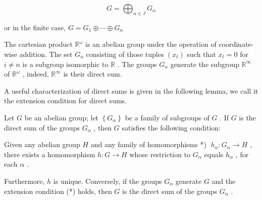 \[
G = {\bigoplus }_{\alpha  \in  J}{G}_{\alpha }
\]

or in the finite case, \(G = {G}_{1} \oplus  \cdots  \oplus  {G}_{n}\)

\begin{example} The cartesian product \({\mathbb{R}}^{\omega }\) is an abelian group under the operation of coordinate-wise addition. The set \({G}_{n}\) consisting of those tuples \(\left( {x}_{t}\right)\) such that \({x}_{t} = 0\) for \(i \neq  n\) is a subgroup isomorphic to \(\mathbb{R}\) . The groups \({G}_{n}\) generate the subgroup \({\mathbb{R}}^{\infty }\) of \({\mathbb{R}}^{\omega }\) , indeed, \({\mathbb{R}}^{\infty }\) is their direct sum.
\end{example}

A useful characterization of direct sums is given in the following lemma, we call it the extension condition for direct sums.

\begin{lemma} Let \(G\) be an abelian group; let \(\left\{  {G}_{\alpha }\right\}\) be a family of subgroups of \(G\) . If \(G\) is the direct sum of the groups \({G}_{\alpha }\) , then \(G\) satisfies the following condition:

Given any abelian group \(H\) and any family of homomorphisms *) \(\;{h}_{\alpha } : {G}_{\alpha } \rightarrow  H\) , there exists a homomorphism \(h : G \rightarrow  H\) whose restriction to \({G}_{\alpha }\) equals \({h}_{\alpha }\) , for each \(\alpha\) .

Furthermore, \(h\) is unique. Conversely, if the groups \({G}_{\alpha }\) generate \(G\) and the extension condition (*) holds, then \(G\) is the direct sum of the groups \({G}_{\alpha }\) .
\end{lemma}

